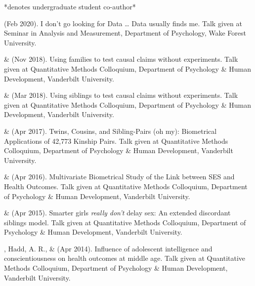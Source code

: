 \vspace{-2mm}\begin{center}\footnotesize{*denotes undergraduate student co-author*}\end{center} \vspace{-3mm}


\item\meb (Feb 2020). I don’t go looking for Data … Data usually finds me. Talk given at Seminar in Analysis and Measurement, Department of Psychology, Wake Forest University. 

\item\meb \& \Joe (Nov 2018). Using families to test causal claims without experiments. Talk given at Quantitative Methods Colloquium, Department of Psychology \& Human Development, Vanderbilt University. 

\item\meb \& \Joe (Mar 2018). Using siblings to test causal claims without experiments. Talk given at Quantitative Methods Colloquium, Department of Psychology \& Human Development, Vanderbilt University. 
\item\meb \& \Joe (Apr 2017). Twins, Cousins, and Sibling-Pairs (oh my): Biometrical Applications of 42,773 Kinship Pairs. Talk given at Quantitative Methods Colloquium, Department of Psychology \& Human Development, Vanderbilt University. 
\item\meb \& \Joe (Apr 2016). Multivariate Biometrical Study of the Link between SES and Health Outcomes. Talk given at Quantitative Methods Colloquium, Department of Psychology \& Human Development, Vanderbilt University.

\item\meb \& \Joe (Apr 2015). Smarter girls \textit{really don't} delay sex: An extended discordant siblings model. Talk given at Quantitative Methods Colloquium, Department of Psychology \& Human Development, Vanderbilt University.
\item\meb, Hadd, A. R., \& \Joe (Apr 2014). Influence of adolescent intelligence and conscientiousness on health outcomes at middle age. Talk given at Quantitative Methods Colloquium, Department of Psychology \& Human Development, Vanderbilt University. 

